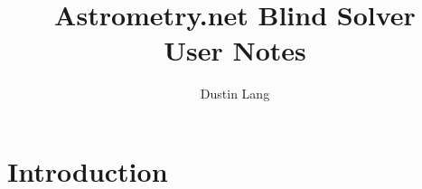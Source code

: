 \documentclass[12pt,letterpaper]{article}
\begin{document}
\title{Astrometry.net Blind Solver \\ User Notes}
\author{Dustin Lang}

\maketitle

\newpage

\section*{Introduction}
\end{document}
